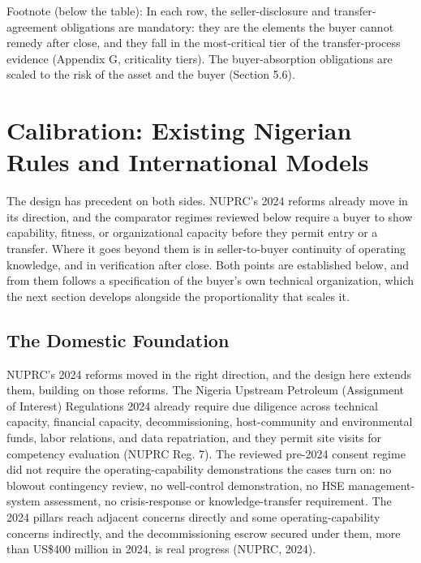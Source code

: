 \documentclass[twoside,fontset=lmodern]{mitthesis}
\begin{document}
Footnote (below the table): In each row, the seller-disclosure and
transfer-agreement obligations are mandatory: they are the elements the
buyer cannot remedy after close, and they fall in the most-critical tier
of the transfer-process evidence (Appendix G, criticality tiers). The
buyer-absorption obligations are scaled to the risk of the asset and the
buyer (Section 5.6).

\hypertarget{calibration-existing-nigerian-rules-and-international-models}{%
\section{Calibration: Existing Nigerian Rules and International
Models}\label{calibration-existing-nigerian-rules-and-international-models}}

The design has precedent on both sides. NUPRC's 2024 reforms already
move in its direction, and the comparator regimes reviewed below require
a buyer to show capability, fitness, or organizational capacity before
they permit entry or a transfer. Where it goes beyond them is in
seller-to-buyer continuity of operating knowledge, and in verification
after close. Both points are established below, and from them follows a
specification of the buyer's own technical organization, which the next
section develops alongside the proportionality that scales it.

\hypertarget{the-domestic-foundation}{%
\subsection{The Domestic Foundation}\label{the-domestic-foundation}}

NUPRC's 2024 reforms moved in the right direction, and the design here
extends them, building on those reforms. The Nigeria Upstream Petroleum
(Assignment of Interest) Regulations 2024 already require due diligence
across technical capacity, financial capacity, decommissioning,
host-community and environmental funds, labor relations, and data
repatriation, and they permit site visits for competency evaluation
(NUPRC Reg. 7). The reviewed pre-2024 consent regime did not require the
operating-capability demonstrations the cases turn on: no blowout
contingency review, no well-control demonstration, no HSE
management-system assessment, no crisis-response or knowledge-transfer
requirement. The 2024 pillars reach adjacent concerns directly and some
operating-capability concerns indirectly, and the decommissioning escrow
secured under them, more than US\$400 million in 2024, is real progress
(NUPRC, 2024).
\end{document}
